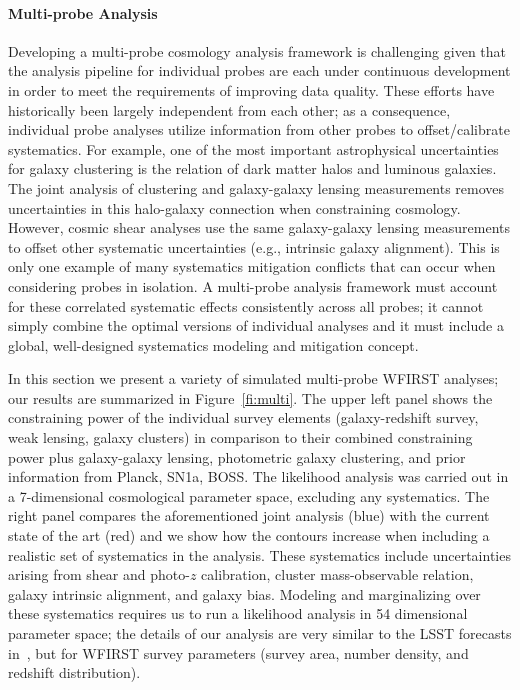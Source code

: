 \paragraph{\CoLi Multi-probe Analysis} Developing a multi-probe cosmology analysis framework is challenging given that the analysis pipeline for individual probes are each under continuous
development in order to meet the requirements of improving data quality. These
efforts have historically been largely independent from each other; as a
consequence, individual probe analyses utilize information from other probes to
offset/calibrate systematics. For example, one of the most important
astrophysical uncertainties for galaxy clustering is the relation of dark matter
halos and luminous galaxies. The joint analysis of clustering and galaxy-galaxy
lensing measurements removes uncertainties in this halo-galaxy connection when
constraining cosmology. However, cosmic shear analyses use the same
galaxy-galaxy lensing measurements to offset other systematic uncertainties
(e.g., intrinsic galaxy alignment). This is only one example of many systematics
mitigation conflicts that can occur when considering probes in isolation. A
multi-probe analysis framework must account for these correlated systematic
effects consistently across all probes; it cannot simply combine the optimal
versions of individual analyses and it must include a global, well-designed
systematics modeling and mitigation concept.

In this section we present a variety of simulated multi-probe WFIRST analyses;
our results are summarized in Figure~\ref{fi:multi}. The upper left panel shows
the constraining power of the individual survey elements (galaxy-redshift
survey, weak lensing, galaxy clusters) in comparison to their combined
constraining power plus galaxy-galaxy lensing, photometric galaxy clustering,
and prior information from Planck, SN1a, BOSS\@. The likelihood analysis was
carried out in a 7-dimensional cosmological parameter space, excluding any
systematics. The right panel compares the aforementioned joint analysis (blue)
with the current state of the art (red) and we show how the contours increase
when including a realistic set of systematics in the analysis. These systematics
include uncertainties arising from shear and photo-$z$ calibration, cluster
mass-observable relation, galaxy intrinsic alignment, and galaxy bias. Modeling
and marginalizing over these systematics requires us to run a likelihood
analysis in 54 dimensional parameter space; the details of our analysis are very
similar to the LSST forecasts in~\citet{Krause2017}, but for WFIRST survey
parameters (survey area, number density, and redshift distribution).

